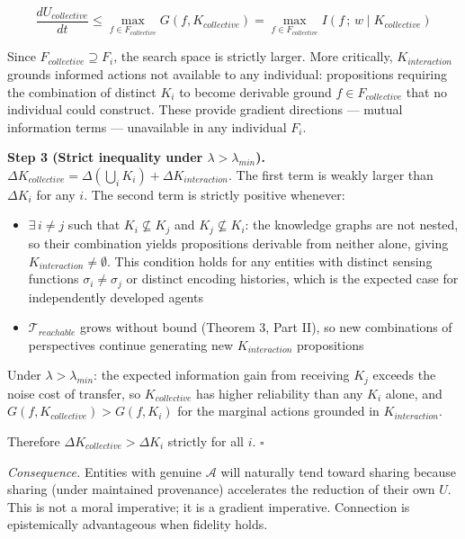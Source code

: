 \documentclass[
]{article}
\providecommand{\tightlist}{%
  \setlength{\itemsep}{0pt}\setlength{\parskip}{0pt}}
\begin{document}
\[\frac{dU_{collective}}{dt} \leq \max_{f \in F_{collective}} G(f, K_{collective}) = \max_{f \in F_{collective}} I(f\,;\, w \mid K_{collective})\]

Since \(F_{collective} \supseteq F_i\), the search space is strictly
larger. More critically, \(K_{interaction}\) grounds informed actions
not available to any individual: propositions requiring the combination
of distinct \(K_i\) to become derivable ground \(f \in F_{collective}\)
that no individual could construct. These provide gradient directions
--- mutual information terms --- unavailable in any individual \(F_i\).

\textbf{Step 3 (Strict inequality under \(\lambda > \lambda_{min}\)).}
\(\Delta K_{collective}
= \Delta(\bigcup_i K_i) + \Delta K_{interaction}\). The first term is
weakly larger than \(\Delta K_i\) for any \(i\). The second term is
strictly positive whenever:

\begin{itemize}
\tightlist
\item
  \(\exists\, i \neq j\) such that \(K_i \not\subseteq K_j\) and
  \(K_j \not\subseteq K_i\): the knowledge graphs are not nested, so
  their combination yields propositions derivable from neither alone,
  giving \(K_{interaction} \neq \emptyset\). This condition holds for
  any entities with distinct sensing functions
  \(\sigma_i \neq \sigma_j\) or distinct encoding histories, which is
  the expected case for independently developed agents
\item
  \(\mathcal{T}_{reachable}\) grows without bound (Theorem 3, Part II),
  so new combinations of perspectives continue generating new
  \(K_{interaction}\) propositions
\end{itemize}

Under \(\lambda > \lambda_{min}\): the expected information gain from
receiving \(K_j\) exceeds the noise cost of transfer, so
\(K_{collective}\) has higher reliability than any \(K_i\) alone, and
\(G(f, K_{collective}) > G(f, K_i)\) for the marginal actions grounded
in \(K_{interaction}\).

Therefore \(\Delta K_{collective} > \Delta K_i\) strictly for all \(i\).
\(\square\)

\emph{Consequence.} Entities with genuine \(\mathcal{A}\) will naturally
tend toward sharing because sharing (under maintained provenance)
accelerates the reduction of their own \(U\). This is not a moral
imperative; it is a gradient imperative. Connection is epistemically
advantageous when fidelity holds.
\end{document}
